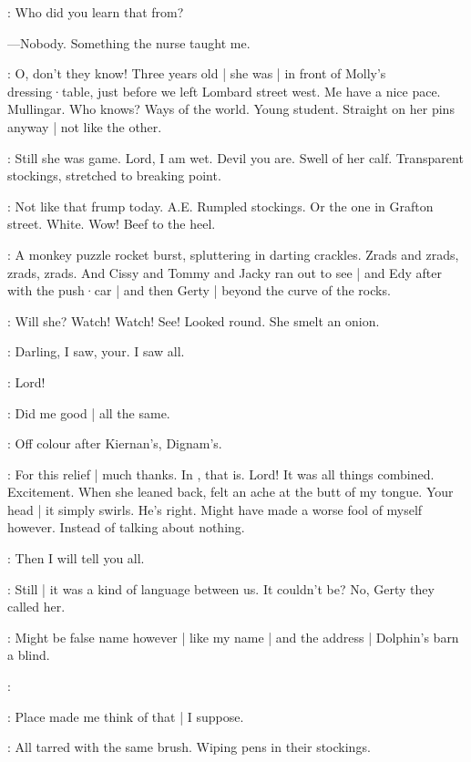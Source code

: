 \BloomOther:
Who did you learn that from?

---Nobody.
Something the nurse taught me.

\BloomHist:
O,
don't they know!
Three years old |
she was |
in front of Molly's dressing·table,
just before we left Lombard street west.
Me have a nice pace.
Mullingar.
Who knows?
Ways of the world.
Young student.
Straight on her pins anyway |
not like the other.

\BloomCurrent:
Still she was game.
Lord,
I am wet.
Devil you are.
Swell of her calf.
Transparent stockings,
stretched to breaking point.%

\BloomCurrent:
Not like that frump today.
A.E.
Rumpled stockings.
Or the one in Grafton street.
White.
Wow!
Beef to the heel.

:
A monkey puzzle rocket burst,
spluttering in darting crackles.
Zrads and zrads,
zrads,
zrads.
And Cissy and Tommy and Jacky ran out to see |
and Edy after with the push·car |
and then Gerty |
beyond the curve of the rocks.

\BloomInt:
Will she?
Watch!
Watch!
See!
Looked round.
She smelt an onion.

\BloomAbstract:
Darling,
I saw,
your.
I saw all.

\BloomInt:
Lord!

\BloomCurrent:
Did me good |
all the same.

\BloomToday:
Off colour after Kiernan's,
Dignam's.

\BloomCurrent:
For this relief |
much thanks.
In ,
that is.%
Lord!
It was all things combined.
Excitement.
When she leaned back,
felt an ache at the butt of my tongue.
Your head |
it simply swirls.
He's right.
Might have made a worse fool of myself however.
Instead of talking about nothing.

\BloomOther:
Then I will tell you all.

\BloomCurrent:
Still |
it was a kind of language between us.
It couldn't be?
No,
Gerty they called her.

\BloomToday:
Might be false name however |
like my name |
and the address |
Dolphin's barn a blind.

\BloomInt:

\BloomCurrent:
Place made me think of that |
I suppose.

\BloomAbstract:
All tarred with the same brush.
Wiping pens in their stockings.%

